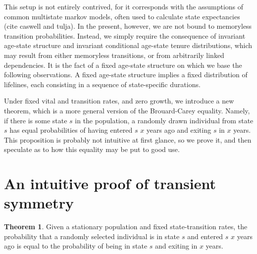 \documentclass[12pt,oneside,a4paper]{article} %
\theoremstyle{definition}
\newtheorem{theorem}{Theorem}[section]
\begin{document}
This setup is not entirely contrived, for it corresponds with the assumptions of
common multistate markov models, often used to calculate state expectancies
(cite caswell and tulja).
In the present, however, we are not bound to memoryless transition probabilities.
Instead, we simply require the consequence of invariant age-state structure and
invariant conditional age-state tenure distributions, which may result from
either memoryless transitions, or from arbitrarily linked
dependencies.
It is the fact of a fixed age-state structure on which we base the following observations.
A fixed age-state structure implies a fixed distribution of lifelines, each
consisting in a sequence of state-specific durations. 

Under fixed vital and transition rates, and zero growth, we introduce a new
theorem, which is a more general version of the Brouard-Carey equality.
Namely, if there is some state $s$ in the population, a
randomly drawn individual from state $s$ has equal probabilities of having
entered $s$ $x$ years ago and exiting $s$ in $x$ years. This proposition
is probably not intuitive at first glance, so we prove it, and then speculate
as to how this equality may be put to good use.

\section{An intuitive proof of transient symmetry}
\FloatBarrier

\begin{theorem}
Given a stationary population and fixed state-transition
rates, the probability that a randomly selected individual is in state $s$ and entered $s$ $x$ years
ago is equal to the probability of being in state $s$ and exiting in $x$ years.
\end{theorem}
\end{document}
